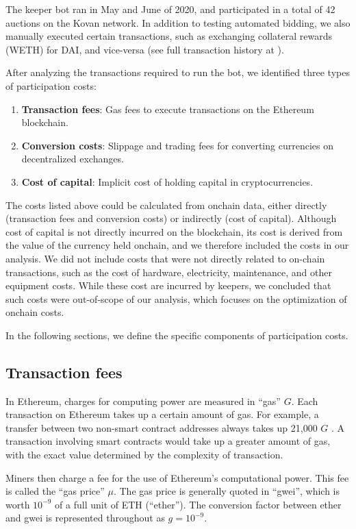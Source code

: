\documentclass[conference]{IEEEtran}
\begin{document}
The keeper bot ran in May and June of 2020, and participated in a total of 42 auctions on the Kovan network. In addition to testing automated bidding, we also manually executed certain transactions, such as exchanging collateral rewards (WETH) for DAI, and vice-versa (see full transaction history at \cite{keeperBot}).

After analyzing the transactions required to run the bot, we identified three types of participation costs:
\begin{enumerate}
    \item \textbf{Transaction fees}: Gas fees to execute transactions on the Ethereum blockchain.
    \item \textbf{Conversion costs}: Slippage and trading fees for converting currencies on decentralized exchanges.
    \item \textbf{Cost of capital}: Implicit cost of holding capital in cryptocurrencies.
\end{enumerate}

The costs listed above could be calculated from onchain data, either directly (transaction fees and conversion costs) or indirectly (cost of capital). Although cost of capital is not directly incurred on the blockchain, its cost is derived from the value of the currency held onchain, and we therefore included the costs in our analysis. We did not include costs that were not directly related to on-chain transactions, such as the cost of hardware, electricity, maintenance, and other equipment costs. While these cost are incurred by keepers, we concluded that such costs were out-of-scope of our analysis, which focuses on the optimization of onchain costs. 

In the following sections, we define the specific components of participation costs.

\subsection{Transaction fees}
In Ethereum, charges for computing power are measured in ``gas'' $G$. Each transaction on Ethereum takes up a certain amount of gas. For example, a transfer between two non-smart contract addresses always takes up 21,000 $G$ \cite{gasUsage}. A transaction involving smart contracts would take up a greater amount of gas, with the exact value determined by the complexity of transaction.

Miners then charge a fee for the use of Ethereum's computational power. This fee is called the ``gas price'' $\mu$. The gas price is generally quoted in ``gwei'', which is worth \( 10^{-9} \) of a full unit of ETH (``ether''). The conversion factor between ether and gwei is represented throughout as \( g = 10^{-9} \).
\end{document}
